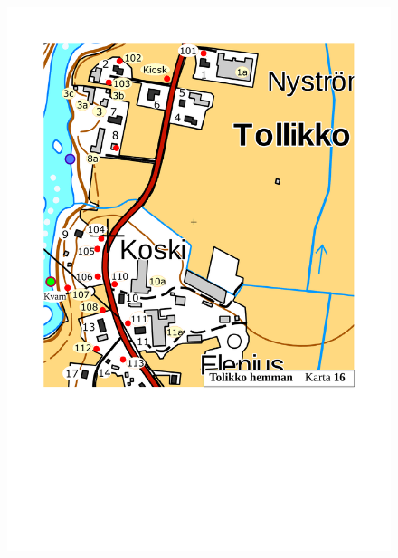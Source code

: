 \begin{figure}[htbp]
  \centering
  \includegraphics[width=1\textwidth]{kartor/Karta16.pdf}
  \label{map:16}
\end{figure}

